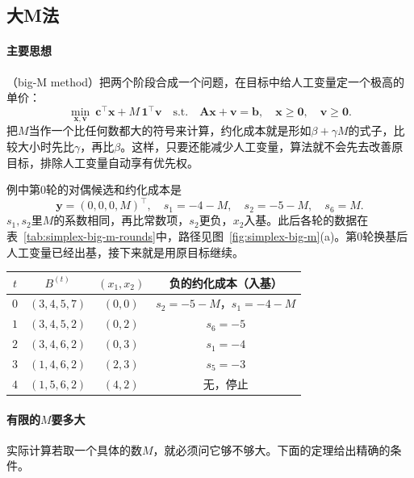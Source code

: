 \subsection{大M法}
\label{sec:simplex-big-m}

\paragraph{主要思想}
（big-M method）把两个阶段合成一个问题，在目标中给人工变量定一个极高的单价：
\begin{equation}
 \min_{\bm{x},\bm{v}}\ \bm{c}^\top\bm{x}+M\,\bm{1}^\top\bm{v}
 \quad\text{s.t.}\quad
 \bm{A}\bm{x}+\bm{v}=\bm{b},\quad\bm{x}\geq\bm{0},\quad\bm{v}\geq\bm{0}.
 \label{eq:simplex-big-m}
\end{equation}
把$M$当作一个比任何数都大的符号来计算，约化成本就是形如$\beta+\gamma M$的式子，比较大小时先比$\gamma$，再比$\beta$。这样，只要还能减少人工变量，算法就不会先去改善原目标，排除人工变量自动享有优先权。

例中第$0$轮的对偶候选和约化成本是
\[
 \bm{y}=(0,0,0,M)^\top,\quad s_1=-4-M,\quad s_2=-5-M,\quad s_6=M.
\]
$s_1,s_2$里$M$的系数相同，再比常数项，$s_2$更负，$x_2$入基。此后各轮的数据在表~\ref{tab:simplex-big-m-rounds}中，路径见图~\ref{fig:simplex-big-m}(a)。第$0$轮换基后人工变量已经出基，接下来就是用原目标继续。

\begin{BookInlineTable}
 \centering
 \begin{tabular}{cccc}
  \toprule
  $t$ & $B^{(t)}$ & $(x_1,x_2)$ & 负的约化成本（入基）\\
  \midrule
  $0$ & $(3,4,5,7)$ & $(0,0)$ & $s_2=-5-M$，$s_1=-4-M$\\
  $1$ & $(3,4,5,2)$ & $(0,2)$ & $s_6=-5$\\
  $2$ & $(3,4,6,2)$ & $(0,3)$ & $s_1=-4$\\
  $3$ & $(1,4,6,2)$ & $(2,3)$ & $s_5=-3$\\
  $4$ & $(1,5,6,2)$ & $(4,2)$ & 无，停止\\
  \bottomrule
 \end{tabular}
 \caption{符号化大M法的各轮数据。}
 \label{tab:simplex-big-m-rounds}
\end{BookInlineTable}

\paragraph{有限的$M$要多大}
实际计算若取一个具体的数$M$，就必须问它够不够大。下面的定理给出精确的条件。

